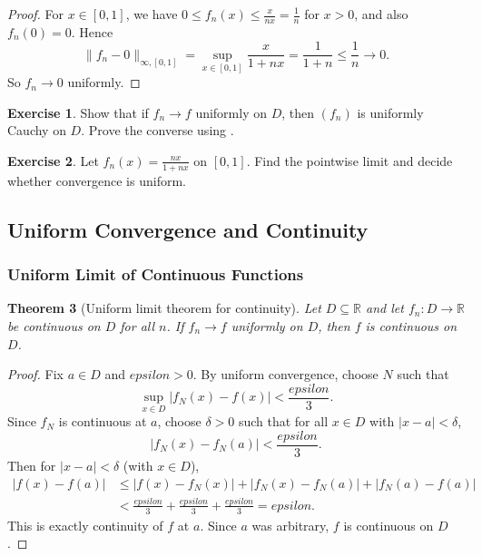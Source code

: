 \documentclass[12pt]{article}
\numberwithin{equation}{section}
\def\abs#1{|#1|}
\def\eps{epsilon}
\newcommand{\RR}{\mathbb{R}}
\DeclarePairedDelimiter{\abs}{\lvert}{\rvert}
\newcommand{\eps}{\varepsilon}               %
\theoremstyle{plain}
\newtheorem{theorem}{Theorem}[section]
\theoremstyle{definition}
\newtheorem{exercise}[theorem]{Exercise}
\theoremstyle{remark}
\begin{document}
\begin{proof}
For $x\in[0,1]$, we have $0\le f_n(x)\le \frac{x}{n x}=\frac{1}{n}$ for $x>0$, and also $f_n(0)=0$.
Hence
\[
\|f_n-0\|_{\infty,[0,1]}=\sup_{x\in[0,1]}\frac{x}{1+n x}=\frac{1}{1+n}\le \frac{1}{n}\to 0.
\]
So $f_n\to 0$ uniformly.
\end{proof}

\begin{exercise}
Show that if $f_n\to f$ uniformly on $D$, then $(f_n)$ is uniformly Cauchy on $D$.
Prove the converse using .
\end{exercise}

\begin{exercise}
Let $f_n(x)=\frac{n x}{1+n x}$ on $[0,1]$. Find the pointwise limit and decide whether convergence is uniform.
\end{exercise}

\newpage

\subsection{Uniform Convergence and Continuity}

\subsubsection{Uniform Limit of Continuous Functions}

\begin{theorem}[Uniform limit theorem for continuity]\label{thm:uniform-limit-cont}
Let $D\subseteq\RR$ and let $f_n:D\to\RR$ be continuous on $D$ for all $n$.
If $f_n\to f$ uniformly on $D$, then $f$ is continuous on $D$.
\end{theorem}

\begin{proof}
Fix $a\in D$ and $\eps>0$.
By uniform convergence, choose $N$ such that
\[
\sup_{x\in D}\abs{f_N(x)-f(x)}<\frac{\eps}{3}.
\]
Since $f_N$ is continuous at $a$, choose $\delta>0$ such that for all $x\in D$ with $\abs{x-a}<\delta$,
\[
\abs{f_N(x)-f_N(a)}<\frac{\eps}{3}.
\]
Then for $\abs{x-a}<\delta$ (with $x\in D$),
\begin{align*}
\abs{f(x)-f(a)}
&\le \abs{f(x)-f_N(x)}+\abs{f_N(x)-f_N(a)}+\abs{f_N(a)-f(a)}\\
&< \frac{\eps}{3}+\frac{\eps}{3}+\frac{\eps}{3}=\eps.
\end{align*}
This is exactly continuity of $f$ at $a$. Since $a$ was arbitrary, $f$ is continuous on $D$.
\end{proof}
\end{document}
